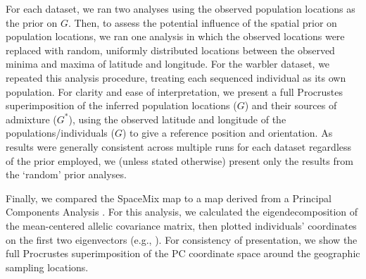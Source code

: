 \documentclass[10pt,letterpaper]{article}
\newcommand{\identifyadmixsource}[1]{{#1^{*}}}
\begin{document}
For each dataset, we ran two analyses using the observed population locations as the prior on $G$.  
Then, to assess the potential influence of the spatial prior on population locations, 
we ran one analysis in which the observed locations
were replaced with random, uniformly distributed locations between the observed minima and maxima of latitude and longitude.
For the warbler dataset, we repeated this analysis procedure, treating each sequenced individual as its own population.  
For clarity and ease of interpretation, we present a full Procrustes superimposition of the inferred population locations ($G$) 
and their sources of admixture ($\identifyadmixsource{G}$), 
using the observed latitude and longitude of the populations/individuals ($G$) to give a reference position and orientation.  
As results were generally consistent across multiple runs for each dataset regardless of the prior employed, 
we (unless stated otherwise) present only the results from the `random' prior analyses.

Finally, we compared the SpaceMix map to a map derived from a Principal Components Analysis \cite{Patterson2006}.  For this analysis, we calculated the eigendecomposition of the mean-centered allelic covariance matrix, then plotted individuals' coordinates on the first two eigenvectors (e.g., \cite{novembre_genes_2008}).  For consistency of presentation, we show the full Procrustes superimposition of the PC coordinate space around the geographic sampling locations.
\end{document}
